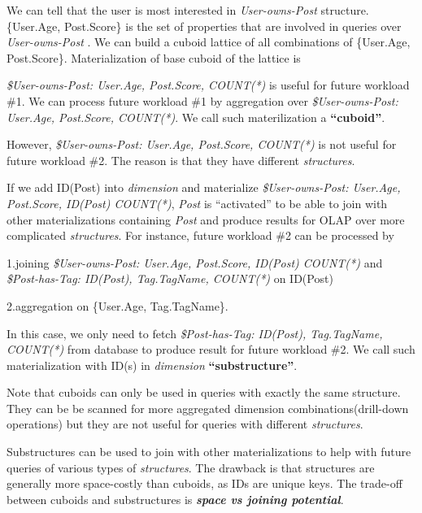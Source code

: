 {%
%
%

We can tell that the user is most interested in  \textit{User-owns-Post} structure. \{User.Age, Post.Score\} is the set of properties that are involved in queries over \textit{User-owns-Post} . We can build a cuboid lattice of all combinations of  \{User.Age, Post.Score\}. Materialization of base cuboid of the lattice is


\textit{\$User-owns-Post: User.Age, Post.Score, COUNT(*)} is useful for future workload \#1. We can process future workload \#1 by aggregation over \textit{\$User-owns-Post: User.Age, Post.Score, COUNT(*)}. We call such materilization a \textbf{``cuboid''}.


However, \textit{\$User-owns-Post: User.Age, Post.Score, COUNT(*)} is not useful for future workload \#2. The reason is that they have different \textit{structures}.


If we add ID(Post) into \textit{dimension} and materialize \textit{\$User-owns-Post: User.Age, Post.Score, ID(Post) COUNT(*)}, \textit{Post} is ``activated'' to be able to join with other materializations containing \textit{Post} and produce results for OLAP over more complicated \textit{structures}. For instance, future workload \#2 can be processed by 


1.joining \textit{\$User-owns-Post: User.Age, Post.Score, ID(Post) COUNT(*)} and \textit{\$Post-has-Tag: ID(Post), Tag.TagName, COUNT(*)} on ID(Post)

2.aggregation on \{User.Age, Tag.TagName\}. 

In this case, we only need to fetch \textit{\$Post-has-Tag: ID(Post), Tag.TagName, COUNT(*)} from database to produce result for future workload \#2. We call such materialization with ID(s) in \textit{dimension} \textbf{``substructure''}. 

Note that cuboids can only be used in queries with exactly the same structure. They can be be scanned for more aggregated dimension combinations(drill-down operations) but they are not useful for queries with different \textit{structures}. 

Substructures can be used to join with other materializations to help with future queries of various types of \textit{structures}.
The drawback is that structures are generally more space-costly than cuboids, as IDs are unique keys. The trade-off between cuboids and substructures is \textbf{\textit{space vs joining potential}}.

}
